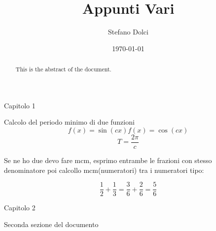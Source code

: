 \documentclass{article}
\begin{document}
\title{Appunti Vari}
\author{Stefano Dolci}
\date{\today}
\maketitle


\begin{abstract}
This is the abstract of the document.
\end{abstract}
\tableofcontents

\begin{section}{Capitolo 1}

    Calcolo del periodo minimo di due funzioni 
    \begin{equation}
        f(x) =\sin(cx)
        f(x) =\cos(cx)
    \end{equation}
    \begin{equation}
        T = \frac{2\pi}{c}
    \end{equation}

Se ne ho due devo fare mcm, esprimo entrambe le frazioni con stesso denominatore
poi calcollo mcm(numeratori) tra i numeratori 
tipo:

\begin{equation}
    \frac{1}{2} + \frac{1}{3} = \frac{3}{6} + \frac{2}{6} = \frac{5}{6}
\end{equation}

\end{section}
\begin{section}{Capitolo 2}

    Seconda sezione del documento
    
\end{section}
\end{document}
